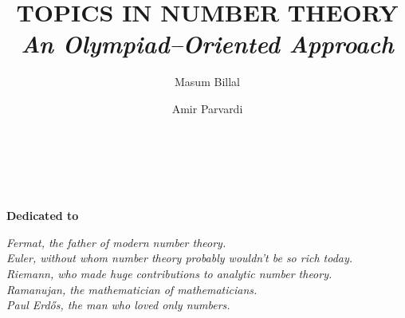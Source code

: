 \documentclass[leqno,12pt]{book}
\title{\bf\Huge TOPICS IN NUMBER THEORY\\ {\vspace*{.3in}\it\LARGE An Olympiad--Oriented Approach}\\\vspace*{.3in}{\Large Second Edition\\\vspace*{.1in}\rule{\textwidth}{0.8pt}}}
\author{
	\Huge Masum Billal
	\and \Huge Amir Parvardi
	\\\vspace*{.4in}
	\rule{\textwidth}{0.8pt}\\\vspace*{.2in}
}
\date{}
\begin{document}
\pagestyle{empty}
\maketitle
\pagestyle{empty}
\frontmatter

\begin{dedication}
	\begin{center}
		\textbf{Dedicated to}
	\end{center}\slshape
	Fermat, the father of modern number theory.\\
	Euler, without whom number theory probably wouldn't be so rich today.\\
	Riemann, who made huge contributions to analytic number theory.\\
	Ramanujan, the mathematician of mathematicians.\\
	Paul Erd\H{o}s, the man who loved only numbers.
\end{dedication}
\end{document}
